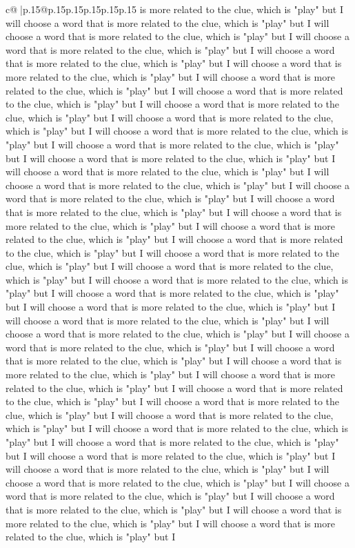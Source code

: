 \documentclass{article}
\begin{document}
{\begin{supertabular}{c@{$\;$}|p{.15\linewidth}@{}p{.15\linewidth}p{.15\linewidth}p{.15\linewidth}p{.15\linewidth}p{.15\linewidth}}
{{{is more related to the clue, which is "play" but I will choose a word that is more related to the clue, which is "play" but I will choose a word that is more related to the clue, which is "play" but I will choose a word that is more related to the clue, which is "play" but I will choose a word that is more related to the clue, which is "play" but I will choose a word that is more related to the clue, which is "play" but I will choose a word that is more related to the clue, which is "play" but I will choose a word that is more related to the clue, which is "play" but I will choose a word that is more related to the clue, which is "play" but I will choose a word that is more related to the clue, which is "play" but I will choose a word that is more related to the clue, which is "play" but I will choose a word that is more related to the clue, which is "play" but I will choose a word that is more related to the clue, which is "play" but I will choose a word that is more related to the clue, which is "play" but I will choose a word that is more related to the clue, which is "play" but I will choose a word that is more related to the clue, which is "play" but I will choose a word that is more related to the clue, which is "play" but I will choose a word that is more related to the clue, which is "play" but I will choose a word that is more related to the clue, which is "play" but I will choose a word that is more related to the clue, which is "play" but I will choose a word that is more related to the clue, which is "play" but I will choose a word that is more related to the clue, which is "play" but I will choose a word that is more related to the clue, which is "play" but I will choose a word that is more related to the clue, which is "play" but I will choose a word that is more related to the clue, which is "play" but I will choose a word that is more related to the clue, which is "play" but I will choose a word that is more related to the clue, which is "play" but I will choose a word that is more related to the clue, which is "play" but I will choose a word that is more related to the clue, which is "play" but I will choose a word that is more related to the clue, which is "play" but I will choose a word that is more related to the clue, which is "play" but I will choose a word that is more related to the clue, which is "play" but I will choose a word that is more related to the clue, which is "play" but I will choose a word that is more related to the clue, which is "play" but I will choose a word that is more related to the clue, which is "play" but I will choose a word that is more related to the clue, which is "play" but I will choose a word that is more related to the clue, which is "play" but I will choose a word that is more related to the clue, which is "play" but I will choose a word that is more related to the clue, which is "play" but I will choose a word that is more related to the clue, which is "play" but I will choose a word that is more related to the clue, which is "play" but I will choose a word that is more related to the clue, which is "play" but I will choose a word that is more related to the clue, which is "play" but I }}}
\end{supertabular}}
\end{document}
